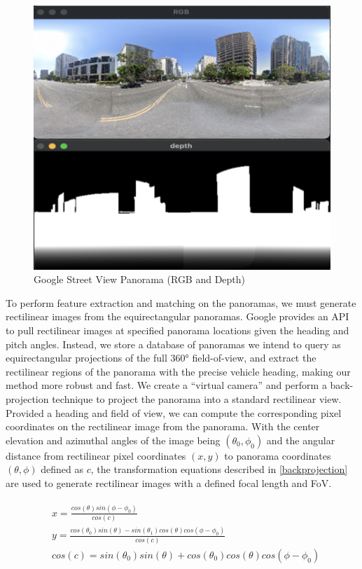 \documentclass[conference]{IEEEtran}
\begin{document}
\begin{figure}[htb]
\centerline{\includegraphics[scale=0.5]{Images/image3.png}}
\caption{Google Street View Panorama (RGB and Depth)}
\label{streetview}
\end{figure}

To perform feature extraction and matching on the panoramas, we must generate rectilinear images from the equirectangular panoramas. Google provides an API to pull rectilinear images at specified panorama locations given the heading and pitch angles. Instead, we store a database of panoramas we intend to query as equirectangular projections of the full 360° field-of-view, and extract the rectilinear regions of the panorama with the precise vehicle heading, making our method more robust and fast. We create a “virtual camera” and perform a back-projection technique to project the panorama into a standard rectilinear view. Provided a heading and field of view, we can compute the corresponding pixel coordinates on the rectilinear image from the panorama. With the center elevation and azimuthal angles of the image being $ (\theta_0, \phi_0) $ and the angular distance from rectilinear pixel coordinates $ (x, y) $ to panorama coordinates $ (\theta, \phi) $ defined as $c$, the transformation equations described in \eqref{backprojection} are used to generate rectilinear images with a defined focal length and FoV.

\begin{equation}
\begin{aligned}
\begin{split}
& x=\frac{cos(\theta)sin(\phi-\phi_0)}{cos(c)}
\\
& y=\frac{cos(\theta_0)sin(\theta) - sin(\theta_1)cos(\theta)cos(\phi-\phi_0)}{cos(c)}
\\
& cos(c)=sin(\theta_0)sin(\theta) + cos(\theta_0)cos(\theta)cos(\phi-\phi_0)
\end{split}
\end{aligned}
\label{backprojection}
\end{equation}
\end{document}
